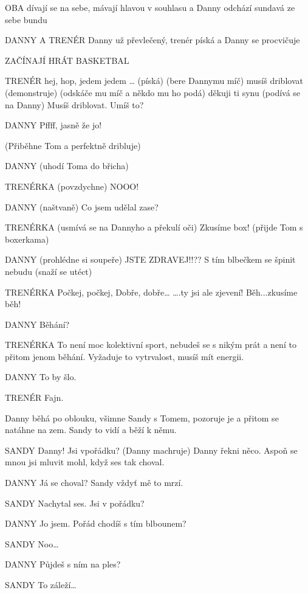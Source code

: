 OBA        dívají se na sebe, mávají hlavou v souhlasu a Danny odchází sundavá        ze sebe bundu

DANNY A TRENÉR         Danny už převlečený, trenér píská a Danny se procvičuje

ZAČÍNAJÍ HRÁT BASKETBAL

TRENÉR        hej, hop, jedem jedem … (píská) (bere Dannymu míč) musíš driblovat         (demonstruje) (odskáče mu míč a někdo mu ho podá) děkuji ti synu                 (podívá se na Danny) Musíš driblovat. Umíš to?

DANNY        Pffff, jasně že jo!

(Přiběhne Tom a perfektně dribluje)

DANNY         (uhodí Toma do břicha)

TRENÉRKA        (povzdychne) NOOO!

DANNY          (naštvaně) Co jsem udělal zase?

TRENÉRKA         (usmívá se na Dannyho a překulí oči)    Zkusíme box! (přijde Tom s                 boxerkama)

DANNY         (prohlédne si soupeře) JSTE ZDRAVEJ!!?? S tím blbečkem se špinit                 nebudu (snaží se utéct)

TRENÉRKA          Počkej, počkej,  Dobře, dobře… ….ty jsi ale zjevení!  Běh...zkusíme běh!

DANNY        Běhání? 

TRENÉRKA          To není moc kolektivní sport, nebudeš se s nikým prát a není to přitom         jenom běhání. Vyžaduje to vytrvalost, musíš mít energii. 

DANNY        To by šlo. 

TRENÉR        Fajn. 

Danny běhá po oblouku, všimne Sandy s Tomem, pozoruje je a přitom se natáhne na zem. Sandy to vidí a běží k němu. 

SANDY        Danny! Jsi vpořádku? (Danny machruje) Danny řekni něco.  Aspoň se         mnou jsi mluvit mohl, když ses tak choval. 

DANNY        Já se choval? Sandy vždyť mě to mrzí. 

SANDY        Nachytal ses.  Jsi v pořádku? 

DANNY        Jo jsem. Pořád chodíš s tím blbounem? 

SANDY        Noo…

DANNY        Půjdeš s ním na ples? 

SANDY        To záleží…

